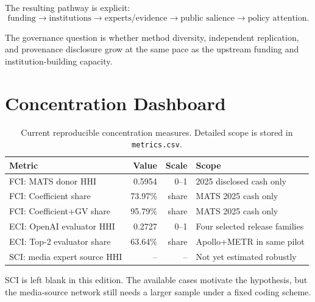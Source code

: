 \documentclass[11pt,twoside]{article}
\begin{document}
The resulting pathway is explicit:
\[
\text{funding}\rightarrow\text{institutions}\rightarrow\text{experts/evidence}\rightarrow\text{public salience}\rightarrow\text{policy attention}.
\]

The governance question is whether method diversity, independent replication, and provenance disclosure grow at the same pace as the upstream funding and institution-building capacity.

\section{Concentration Dashboard}
\begin{table}[ht]
\centering\small
\begin{tabularx}{\linewidth}{lrrX}
\toprule
Metric & Value & Scale & Scope \\
\midrule
FCI: MATS donor HHI & 0.5954 & 0--1 & 2025 disclosed cash only \\
FCI: Coefficient share & 73.97\% & share & MATS 2025 cash only \\
FCI: Coefficient+GV share & 95.79\% & share & MATS 2025 cash only \\
ECI: OpenAI evaluator HHI & 0.2727 & 0--1 & Four selected release families \\
ECI: Top-2 evaluator share & 63.64\% & share & Apollo+METR in same pilot \\
SCI: media expert source HHI & -- & -- & Not yet estimated robustly \\
\bottomrule
\end{tabularx}
\caption{Current reproducible concentration measures. Detailed scope is stored in \texttt{metrics.csv}.}
\end{table}

SCI is left blank in this edition. The available cases motivate the hypothesis, but the media-source network still needs a larger sample under a fixed coding scheme.
\end{document}
